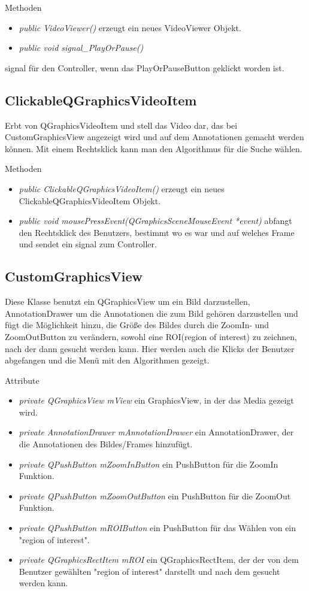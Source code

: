 Methoden
\begin{itemize}
	\item\textit{public VideoViewer()} erzeugt ein neues VideoViewer Objekt.
	\item\textit{public void signal\_PlayOrPause()}
\end{itemize} signal für den Controller, wenn das PlayOrPauseButton geklickt worden ist.

\subsection*{ClickableQGraphicsVideoItem}
Erbt von QGraphicsVideoItem und stell das Video dar, das bei CustomGraphicsView angezeigt wird und auf dem Annotationen gemacht werden können. Mit einem Rechtsklick kann man den Algorithmus für die Suche wählen.

Methoden
\begin{itemize}
	\item\textit{public ClickableQGraphicsVideoItem()} erzeugt ein neues ClickableQGraphicsVideoItem Objekt.
	\item\textit{public void mousePressEvent(QGraphicsSceneMouseEvent *event)} 
	abfangt den Rechtsklick des Benutzers, bestimmt wo es war und auf welches Frame und sendet ein signal zum Controller.
\end{itemize}

\subsection*{CustomGraphicsView}
Diese Klasse benutzt ein QGraphicsView um ein Bild darzustellen, AnnotationDrawer um die Annotationen die zum Bild gehören darzustellen und fügt die Möglichkeit hinzu, die Größe des Bildes durch die ZoomIn- und ZoomOutButton zu verändern, sowohl eine ROI(region of interest) zu zeichnen, nach der dann gesucht werden kann. Hier werden auch die Klicks der Benutzer abgefangen und die Menü mit den Algorithmen gezeigt.

Attribute
\begin{itemize}
	\item\textit{private QGraphicsView mView} ein GraphicsView, in der das Media gezeigt wird. 
	\item\textit{private AnnotationDrawer mAnnotationDrawer} ein AnnotationDrawer, der die Annotationen des Bildes/Frames hinzufügt. 
	\item\textit{private QPushButton mZoomInButton} ein PushButton für die ZoomIn Funktion. 
	\item\textit{private QPushButton mZoomOutButton} 
	ein PushButton für die ZoomOut Funktion.
	\item\textit{private QPushButton mROIButton} ein PushButton für das Wählen von ein "region of interest".
	\item\textit{private QGraphicsRectItem mROI} ein QGraphicsRectItem, der der von dem Benutzer gewählten "region of interest" darstellt und nach dem gesucht werden kann.
\end{itemize}


